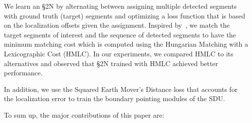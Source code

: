 \documentclass[10pt,journal,compsoc]{IEEEtran}
\begin{document}

%
%
%

We learn an \S2N by alternating between assigning multiple detected segments with ground truth (target) segments and optimizing a loss function that is based on the localization offsets given the assignment. Inspired by~\cite{stewart2016end,graves2006connectionist}, we match the target segments of interest and the sequence of detected segments to have the minimum matching cost which is computed using the Hungarian Matching with a Lexicographic Cost (HMLC). In our experiments, we compared HMLC to its alternatives and observed that \S2N trained with HMLC achieved better performance. 


In addition, we use the Squared Earth Mover's Distance loss that accounts for the localization error to train the boundary pointing modules of the SDU.

To sum up, the major contributions of this paper are: 
\end{document}
